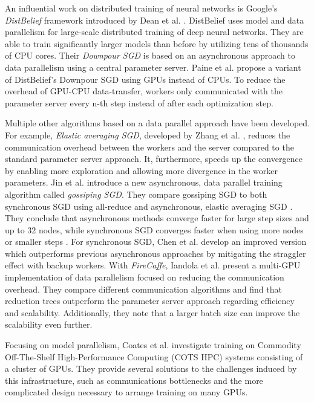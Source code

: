 \documentclass[conference,compsoc,a4paper]{IEEEtran}
\begin{document}
An influential work on distributed training of neural networks is Google’s \emph{DistBelief} framework introduced by Dean et al. \cite{dean2012-Large-scale-distributed}.
DistBelief uses model and data parallelism for large-scale distributed training of deep neural networks.
They are able to train significantly larger models than before by utilizing tens of thousands of CPU cores.
Their \emph{Downpour SGD} is based on an asynchronous approach to data parallelism using a central parameter server.
%
Paine et al. \cite{paine2013-GPU-async-SGD} propose a variant of DistBelief's Downpour SGD using GPUs instead of CPUs.
To reduce the overhead of GPU-CPU data-transfer, workers only communicated with the parameter server every n-th step instead of after each optimization step.

Multiple other algorithms based on a data parallel approach have been developed.
%
For example, \emph{Elastic averaging SGD}, developed by Zhang et al. \cite{zhang2015-Elastic-AvgSGD}, reduces the communication overhead between the workers and the server compared to the standard parameter server approach.
It, furthermore, speeds up the convergence by enabling more exploration and allowing more divergence in the worker parameters.
%
Jin et al. \cite{jin2016-How-to-scale} introduce a new asynchronous, data parallel training algorithm called \emph{gossiping SGD}.
They compare gossiping SGD to both synchronous SGD using all-reduce and asynchronous, elastic averaging SGD \cite{zhang2015-Elastic-AvgSGD}.
They conclude that asynchronous methods converge faster for large step sizes and up to 32 nodes, while synchronous SGD converges faster when using more nodes or smaller steps \cite{jin2016-How-to-scale}.
%
For synchronous SGD, Chen et al. \cite{chen2016-Revisiting-distributed-synchronous-SGD} develop an improved version which outperforms previous asynchronous approaches by mitigating the straggler effect with backup workers.
%
With \emph{FireCaffe}, Iandola et al. \cite{iandola2016-Firecaffe} present a multi-GPU implementation of data parallelism focused on reducing the communication overhead.
They compare different communication algorithms and find that reduction trees outperform the parameter server approach regarding efficiency and scalability.
Additionally, they note that a larger batch size can improve the scalability even further.

Focusing on model parallelism, Coates et al. \cite{coates2013-DL-COTS-HPC} investigate training on Commodity Off-The-Shelf High-Performance Computing (COTS HPC) systems consisting of a cluster of GPUs.
They provide several solutions to the challenges induced by this infrastructure, such as communications bottlenecks and the more complicated design necessary to arrange training on many GPUs.
\end{document}
